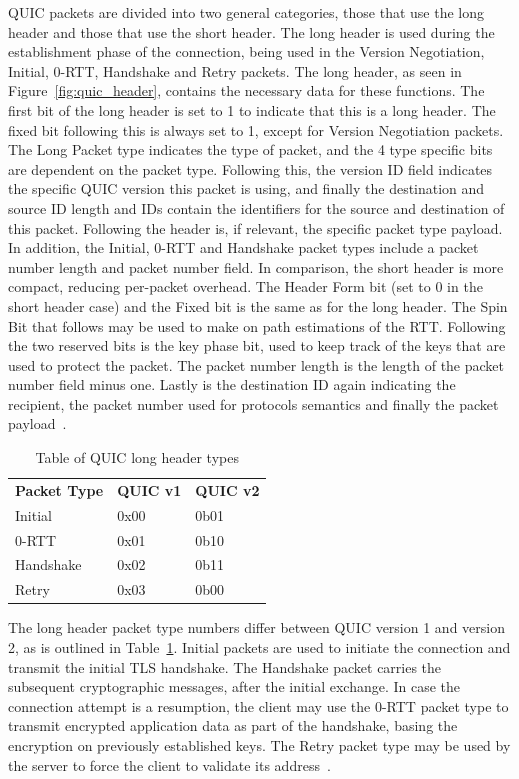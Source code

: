 \documentclass[english, 12pt, a4paper, elec, utf8, a-2b, online]{aaltothesis}
\begin{document}
QUIC packets are divided into two general categories, those that use the long header
and those that use the short header. The long header is used during the establishment
phase of the connection, being used in the Version Negotiation, Initial, 0-RTT, Handshake
and Retry packets. The long header, as seen in Figure~\ref{fig:quic_header}, contains the
necessary data for these functions. The first bit of the long header is set to 1 to indicate
that this is a long header. The fixed bit following this is always set to 1, except
for Version Negotiation packets. The Long Packet type indicates the type of packet,
and the 4 type specific bits are dependent on the packet type. Following this,
the version ID field indicates the specific QUIC version this packet is using, and
finally the destination and source ID length and IDs contain the identifiers for
the source and destination of this packet. Following the header is, if relevant,
the specific packet type payload. In addition, the Initial, 0-RTT and Handshake
packet types include a packet number length and packet number field. In comparison,
the short header is more compact, reducing per-packet overhead. The Header Form bit
(set to 0 in the short header case) and the Fixed bit is the same as for the long
header. The Spin Bit that follows may be used to make on path estimations of
the RTT. Following the two reserved bits is the key phase bit, used to keep
track of the keys that are used to protect the packet. The packet number length
is the length of the packet number field minus one. Lastly is the destination ID
again indicating the recipient, the packet number used for protocols semantics
and finally the packet payload~\cite{rfc9000}.

\begin{table}[tb]
	\centering
	\caption{Table of QUIC long header types}
	\label{tab:quic_long_header_types}
	\begin{tabular}{lll}
	\textbf{Packet Type}		  & \textbf{QUIC v1} & \textbf{QUIC v2} \\
	Initial   & 0x00    & 0b01    \\
	0-RTT     & 0x01    & 0b10    \\
	Handshake & 0x02    & 0b11    \\
	Retry     & 0x03    & 0b00   
	\end{tabular}
\end{table}
The long header packet type numbers differ between QUIC version 1 and version 2, as
is outlined in Table~\ref{tab:quic_long_header_types}. Initial packets are used to initiate the connection and transmit
the initial TLS handshake. The Handshake packet carries the subsequent
cryptographic messages, after the initial exchange. In case the connection attempt is
a resumption, the client may use the 0-RTT packet type to transmit encrypted application
data as part of the handshake, basing the encryption on previously established keys. The
Retry packet type may be used by the server to force the client to
validate its address~\cite{rfc9000}.
\end{document}
